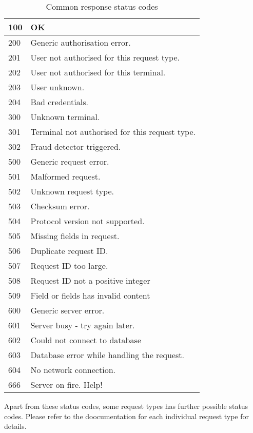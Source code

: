 \documentclass[a4paper,11pt]{article}
\begin{document}
\begin{table}[!h]
  \begin{tabular}{|l|l|}
    \hline
      100  & OK \\\hline\hline
      200  & Generic authorisation error.\\\hline
      201  & User not authorised for this request type.\\\hline
      202  & User not authorised for this terminal.\\\hline
      203  & User unknown.\\\hline
      204  & Bad credentials.\\\hline\hline
      300  & Unknown terminal.\\\hline
      301  & Terminal not authorised for this request
             type.\\\hline
      302  & Fraud detector triggered.\\\hline\hline
      500  & Generic request error.\\\hline
      501  & Malformed request.\\\hline
      502  & Unknown request type.\\\hline
      503  & Checksum error.\\\hline
      504  & Protocol version not supported.\\\hline
      505  & Missing fields in request.\\\hline
      506  & Duplicate request ID.\\\hline
      507  & Request ID too large.\\\hline
      508  & Request ID not a positive integer\\\hline
      509  & Field or fields has invalid content\\\hline\hline
      600  & Generic server error.\\\hline
      601  & Server busy - try again later.\\\hline
      602  & Could not connect to database\\\hline
      603  & Database error while handling the request.\\\hline
      604  & No network connection.\\\hline
      666  & Server on fire. Help!\\\hline
  \end{tabular} 
  \caption{Common response status codes}
\end{table}

Apart from these status codes, some request types has further possible
status codes. Please refer to the doocumentation for each individual
request type for details. 
\end{document}
